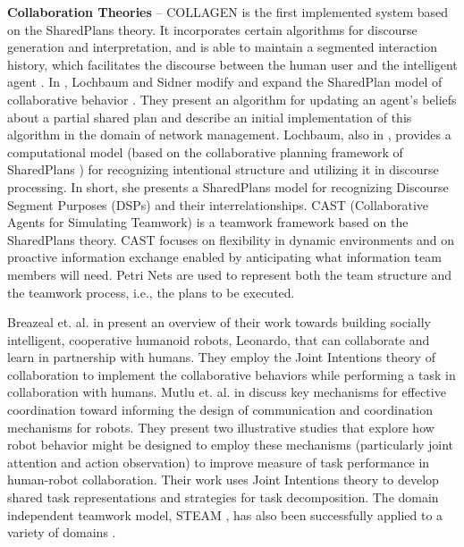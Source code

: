 \textbf{Collaboration Theories} -- COLLAGEN
\cite{rich:collaboration-manager,rich:discourse} is the first implemented system
based on the SharedPlans theory. It incorporates certain algorithms for
discourse generation and interpretation, and is able to maintain a segmented
interaction history, which facilitates the discourse between the human user and
the intelligent agent \cite{rickel:discourse-theory-dialogue}. In
\cite{lochbaum:plan-models}, Lochbaum and Sidner modify and expand the
SharedPlan model of collaborative behavior \cite{grosz:plans-discourse}. They
present an algorithm for updating an agent's beliefs about a partial shared plan
and describe an initial implementation of this algorithm in the domain of
network management. Lochbaum, also in \cite{lochbaum:collaborative-planning},
provides a computational model (based on the collaborative planning framework of
SharedPlans \cite{grosz:collaboration}) for recognizing intentional structure
and utilizing it in discourse processing. In short, she presents a SharedPlans
model for recognizing Discourse Segment Purposes (DSPs)
\cite{grosz:plans-discourse} \cite{sidner:discourse-collaborative-negotiation}
and their interrelationships. CAST (Collaborative Agents for Simulating
Teamwork) \cite{yen:cast} \cite{yin:knowledge-based-sharedplans} is a teamwork
framework based on the SharedPlans theory. CAST focuses on flexibility in
dynamic environments and on proactive information exchange enabled by
anticipating what information team members will need. Petri Nets are used to
represent both the team structure and the teamwork process, i.e., the plans to
be executed.

Breazeal et. al. in \cite{breazeal:humanoid-robots} present an overview of their
work towards building socially intelligent, cooperative humanoid robots,
Leonardo, that can collaborate and learn in partnership with humans. They employ
the Joint Intentions theory of collaboration to implement the collaborative
behaviors while performing a task in collaboration with humans. Mutlu et. al. in
\cite{mutlu:coordination-robot} discuss key mechanisms for effective
coordination toward informing the design of communication and coordination
mechanisms for robots. They present two illustrative studies that explore how
robot behavior might be designed to employ these mechanisms (particularly joint
attention and action observation) to improve measure of task performance in
human-robot collaboration. Their work uses Joint Intentions theory to develop
shared task representations and strategies for task decomposition. The domain
independent teamwork model, STEAM \cite{tambe:flexible-teamwork}, has also been
successfully applied to a variety of domains
\cite{kabil:coordination-mechanisms} \cite{kitano:robocup}
\cite{marsella:robocup} \cite{scerri:robot-agent-person}.\\

